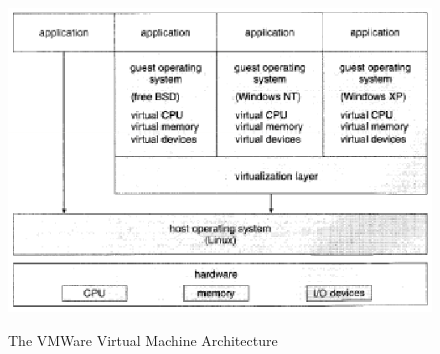 \documentclass[10pt,a4paper]{article}
\begin{document}
\begin{figure}
\caption{The VMWare Virtual Machine Architecture \cite{OSCONCEPTS}}
\begin{center}
\includegraphics[scale=0.45]{../images/vm-arch.png}
\label{vmarch}
\end{center}
\end{figure}
{}

\begin{center}
\end{center}
\end{document}

